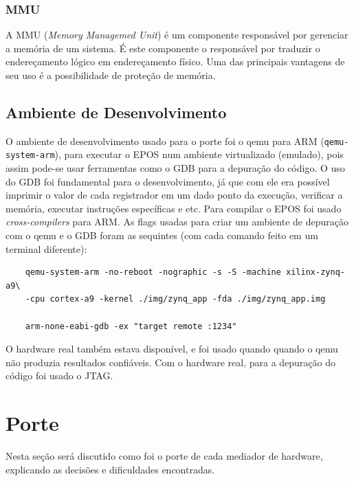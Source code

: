 \documentclass{ufscThesis/ufscThesis} %
\begin{document}
\subsection{MMU} %

A MMU (\emph{Memory Managemed Unit}) é um componente responsável por gerenciar a memória de um sistema. É este componente o responsável por traduzir o endereçamento lógico em endereçamento físico. Uma das principais vantagens de seu uso é a possibilidade de proteção de memória.

\section{Ambiente de Desenvolvimento}

O ambiente de desenvolvimento usado para o porte foi o qemu para ARM (\verb+qemu-system-arm+), para executar o EPOS num ambiente virtualizado (emulado), pois assim pode-se usar ferramentas como o GDB para a depuração do código. O uso do GDB foi fundamental para o desenvolvimento, já que com ele era possível imprimir o valor de cada registrador em um dado ponto da execução, verificar a memória, executar instruções específicas e etc. Para compilar o EPOS foi usado \emph{cross-compilers} para ARM. As flags usadas para criar um ambiente de depuração com o qemu e o GDB foram as sequintes (com cada comando feito em um terminal diferente):
\begin{verbatim}
	qemu-system-arm -no-reboot -nographic -s -S -machine xilinx-zynq-a9\
	-cpu cortex-a9 -kernel ./img/zynq_app -fda ./img/zynq_app.img

	arm-none-eabi-gdb -ex "target remote :1234"
\end{verbatim}

O hardware real também estava disponível, e foi usado quando quando o qemu não produzia resultados confiáveis. Com o hardware real, para a depuração do código foi usado o JTAG.

\chapter{Porte}



Nesta seção será discutido como foi o porte de cada mediador de hardware, explicando as decisões e dificuldades encontradas.
\end{document}
